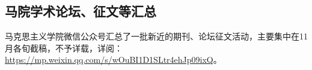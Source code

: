 \documentclass[letterpaper, 12pt]{article}
\begin{document}
\begin{multicols}{2}
\section{马院学术论坛、征文等汇总}
马克思主义学院微信公众号汇总了一批新近的期刊、论坛征文活动，主要集中在11月各旬截稿，不予详载，详阅：\url{https://mp.weixin.qq.com/s/wOuBI1D1SLtr4ehJp09ixQ}。
\end{multicols} 
\end{document}
